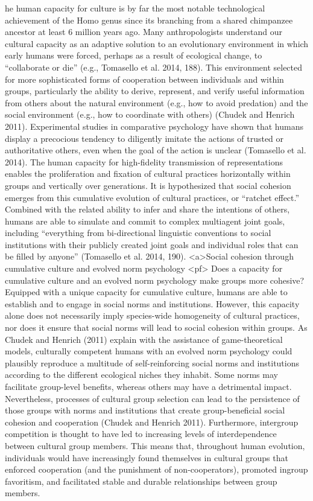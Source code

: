 he human capacity for culture is by far the most notable technological achievement of the Homo genus since its branching from a shared chimpanzee ancestor at least 6 million years ago. Many anthropologists understand our cultural capacity as an adaptive solution to an evolutionary environment in which early humans were forced, perhaps as a result of ecological change, to “collaborate or die” (e.g., Tomasello et al. 2014, 188). This environment selected for more sophisticated forms of cooperation between individuals and within groups, particularly the ability to derive, represent, and verify useful information from others about the natural environment (e.g., how to avoid predation) and the social environment (e.g., how to coordinate with others) (Chudek and Henrich 2011).
Experimental studies in comparative psychology have shown that humans display a precocious tendency to diligently imitate the actions of trusted or authoritative others, even when the goal of the action is unclear (Tomasello et al. 2014). The human capacity for high-fidelity transmission of representations enables the proliferation and fixation of cultural practices horizontally within groups and vertically over generations. It is hypothesized that social cohesion emerges from this cumulative evolution of cultural practices, or “ratchet effect.” Combined with the related ability to infer and share the intentions of others, humans are able to simulate and commit to complex multiagent joint goals, including “everything from bi-directional linguistic conventions to social institutions with their publicly created joint goals and individual roles that can be filled by anyone” (Tomasello et al. 2014, 190).
<a>Social cohesion through cumulative culture and evolved norm psychology
<pf> Does a capacity for cumulative culture and an evolved norm psychology make groups more cohesive? Equipped with a unique capacity for cumulative culture, humans are able to establish and to engage in social norms and institutions. However, this capacity alone does not necessarily imply species-wide homogeneity of cultural practices, nor does it ensure that social norms will lead to social cohesion within groups. As Chudek and Henrich (2011) explain with the assistance of game-theoretical models, culturally competent humans with an evolved norm psychology could plausibly reproduce a multitude of self-reinforcing social norms and institutions according to the different ecological niches they inhabit. Some norms may facilitate group-level benefits, whereas others may have a detrimental impact. Nevertheless, processes of cultural group selection can lead to the persistence of those groups with norms and institutions that create group-beneficial social cohesion and cooperation (Chudek and Henrich 2011). Furthermore, intergroup competition is thought to have led to increasing levels of interdependence between cultural group members. This means that, throughout human evolution, individuals would have increasingly found themselves in cultural groups that enforced cooperation (and the punishment of non-cooperators), promoted ingroup favoritism, and facilitated stable and durable relationships between group members.
